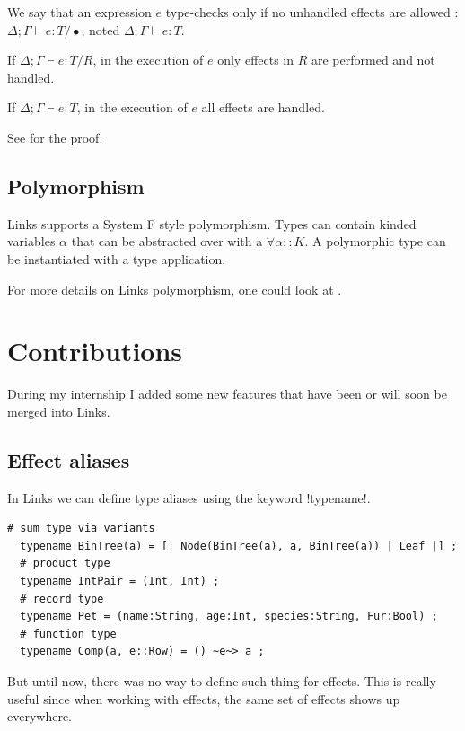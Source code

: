 \documentclass[11pt, nonacm=true, language=french, language=english]{acmart}
\begin{document}
We say that an expression $e$ type-checks only if no unhandled effects are allowed : $\Delta;\Gamma \vdash e : T / \bullet$, noted $\Delta;\Gamma \vdash e : T$.


\begin{thm}
  If $\Delta;\Gamma \vdash e : T / R$, in the execution of $e$ only effects in $R$ are performed and not handled.
\end{thm}
\begin{cor}
  If $\Delta;\Gamma \vdash e : T$, in the execution of $e$ all effects are handled.
\end{cor}

See \citep{links-effect} for the proof.


\subsection{Polymorphism}

Links supports a System F \cite{proof-type-girard} style polymorphism. Types can contain kinded variables $\alpha$ that can be abstracted over with a $\forall \alpha :: K$. A polymorphic type can be instantiated with a type application.

For more details on Links polymorphism, one could look at \cite{polymorph-rpc-links}.


\section{Contributions}
\label{sec:contribution}

During my internship I added some new features that have been or will soon be merged into Links.

\subsection{Effect aliases}

In Links we can define type aliases using the keyword !typename!.
\begin{lstlisting}[caption=Type alias examples]
  # sum type via variants
  typename BinTree(a) = [| Node(BinTree(a), a, BinTree(a)) | Leaf |] ;
  # product type
  typename IntPair = (Int, Int) ;
  # record type
  typename Pet = (name:String, age:Int, species:String, Fur:Bool) ;
  # function type
  typename Comp(a, e::Row) = () ~e~> a ;
\end{lstlisting}

But until now, there was no way to define such thing for effects. This is really useful since when working with effects, the same set of effects shows up everywhere.
\end{document}
